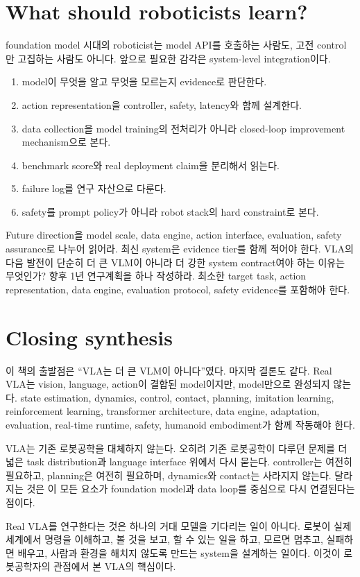 \section{What should roboticists learn?}

foundation model 시대의 roboticist는 model API를 호출하는 사람도, 고전 control만 고집하는 사람도 아니다. 앞으로 필요한 감각은 system-level integration이다.

\begin{enumerate}
  \item model이 무엇을 알고 무엇을 모르는지 evidence로 판단한다.
  \item action representation을 controller, safety, latency와 함께 설계한다.
  \item data collection을 model training의 전처리가 아니라 closed-loop improvement mechanism으로 본다.
  \item benchmark score와 real deployment claim을 분리해서 읽는다.
  \item failure log를 연구 자산으로 다룬다.
  \item safety를 prompt policy가 아니라 robot stack의 hard constraint로 본다.
\end{enumerate}

\chapterwork
{Future direction을 model scale, data engine, action interface, evaluation, safety assurance로 나누어 읽어라. 최신 system은 evidence tier를 함께 적어야 한다.}
{VLA의 다음 발전이 단순히 더 큰 VLM이 아니라 더 강한 system contract여야 하는 이유는 무엇인가?}
{향후 1년 연구계획을 하나 작성하라. 최소한 target task, action representation, data engine, evaluation protocol, safety evidence를 포함해야 한다.}

\section{Closing synthesis}

이 책의 출발점은 ``VLA는 더 큰 VLM이 아니다''였다. 마지막 결론도 같다. Real VLA는 vision, language, action이 결합된 model이지만, model만으로 완성되지 않는다. state estimation, dynamics, control, contact, planning, imitation learning, reinforcement learning, transformer architecture, data engine, adaptation, evaluation, real-time runtime, safety, humanoid embodiment가 함께 작동해야 한다.

VLA는 기존 로봇공학을 대체하지 않는다. 오히려 기존 로봇공학이 다루던 문제를 더 넓은 task distribution과 language interface 위에서 다시 묻는다. controller는 여전히 필요하고, planning은 여전히 필요하며, dynamics와 contact는 사라지지 않는다. 달라지는 것은 이 모든 요소가 foundation model과 data loop를 중심으로 다시 연결된다는 점이다.

Real VLA를 연구한다는 것은 하나의 거대 모델을 기다리는 일이 아니다. 로봇이 실제 세계에서 명령을 이해하고, 볼 것을 보고, 할 수 있는 일을 하고, 모르면 멈추고, 실패하면 배우고, 사람과 환경을 해치지 않도록 만드는 system을 설계하는 일이다. 이것이 로봇공학자의 관점에서 본 VLA의 핵심이다.
